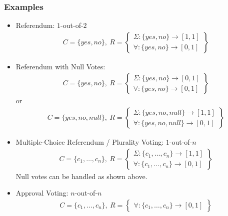 \documentclass[bibtotoc,halfparskip,oneside]{scrreprt}
\begin{document}
\subsubsection{Examples}

\begin{itemize}
\item Referendum: $1$-out-of-$2$
\begin{align*}
	C=\{yes,no\},~ 
	R=\left\{\begin{aligned}\Sigma:\{yes,no\}\rightarrow[1,1] \\ \forall:\{yes,no\}\rightarrow[0,1]\end{aligned}\right\}
\end{align*}

\item Referendum with Null Votes:
\begin{align*}
	C=\{yes,no\},~
	R=\left\{\begin{aligned}\Sigma:\{yes,no\}\rightarrow[0,1] \\ \forall:\{yes,no\}\rightarrow[0,1]\end{aligned}\right\}
\end{align*}
or
\begin{align*}
	C=\{yes,no,null\},~ 
	R=\left\{\begin{aligned}\Sigma:\{yes,no,null\}\rightarrow[1,1] \\ \forall:\{yes,no,null\}\rightarrow[0,1]\end{aligned}\right\}
\end{align*}

\item Multiple-Choice Referendum / Plurality Voting: $1$-out-of-$n$
\begin{align*}
	C=\{c_1,\ldots,c_n\},~ 
	R=\left\{\begin{aligned}\Sigma:\{c_1,\ldots,c_n\}\rightarrow[1,1] \\ \forall:\{c_1,\ldots,c_n\}\rightarrow[0,1]\end{aligned}\right\}
\end{align*}
Null votes can be handled as shown above.

\item Approval Voting: $n$-out-of-$n$ 
\begin{align*}
	C=\{c_1,\ldots,c_n\},~ 
	R=\left\{\begin{aligned}\forall:\{c_1,\ldots,c_n\}\rightarrow[0,1]\end{aligned}\right\}
\end{align*}


\end{itemize}
\end{document}
